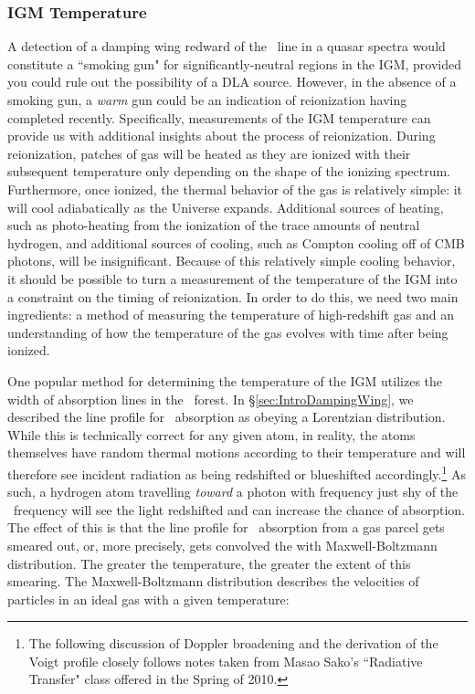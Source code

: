 \subsubsection{IGM Temperature}\label{sec:IntroIGMTemperature}

A detection of a damping wing redward of the \lya\ line in a quasar spectra would constitute a ``smoking gun" for significantly-neutral regions in the IGM, provided you could rule out the possibility of a DLA source. However, in the absence of a smoking gun, a \textit{warm} gun could be an indication of reionization having completed recently. Specifically, measurements of the IGM temperature can provide us with additional insights about the process of reionization. During reionization, patches of gas will be heated as they are ionized with their subsequent temperature only depending on the shape of the ionizing spectrum. Furthermore, once ionized, the thermal behavior of the gas is relatively simple: it will cool adiabatically as the Universe expands. Additional sources of heating, such as photo-heating from the ionization of the trace amounts of neutral hydrogen, and additional sources of cooling, such as Compton cooling off of CMB photons, will be insignificant. Because of this relatively simple cooling behavior, it should be possible to turn a measurement of the temperature of the IGM into a constraint on the timing of reionization. In order to do this, we need two main ingredients: a method of measuring the temperature of high-redshift gas and an understanding of how the temperature of the gas evolves with time after being ionized. 


One popular method for determining the temperature of the IGM utilizes the width of absorption lines in the \lya\ forest. In \S \ref{sec:IntroDampingWing}, we described the line profile for \lya\ absorption as obeying a Lorentzian distribution. While this is technically correct for any given atom, in reality, the atoms themselves have random thermal motions according to their temperature and will therefore see incident radiation as being redshifted or blueshifted accordingly.\footnote{The following discussion of Doppler broadening and the derivation of the Voigt profile closely follows notes taken from Masao Sako's ``Radiative Transfer" class offered in the Spring of 2010.}  As such, a hydrogen atom travelling \textit{toward} a photon with frequency just shy of the \lya\ frequency will see the light redshifted and can increase the chance of absorption. The effect of this is that the line profile for \lya\ absorption from a gas parcel gets smeared out, or, more precisely, gets convolved the with Maxwell-Boltzmann distribution. The greater the temperature, the greater the extent of this smearing. The Maxwell-Boltzmann distribution describes the velocities of particles in an ideal gas with a given temperature:


